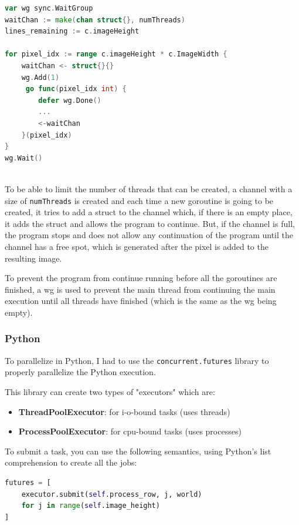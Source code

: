 \begin{lstlisting}[language=Go, caption={Goroutines.}, label={lst:go_goroutines_example}]
var wg sync.WaitGroup
waitChan := make(chan struct{}, numThreads)
lines_remaining := c.imageHeight

for pixel_idx := range c.imageHeight * c.ImageWidth {
    waitChan <- struct{}{}
    wg.Add(1)
     go func(pixel_idx int) { 
        defer wg.Done()
        ... 
        <-waitChan 
    }(pixel_idx)
}
wg.Wait()
    
\end{lstlisting}

To be able to limit the number of threads that can be created, a channel with a size of \texttt{numThreads} is created and each time a new \gls{goroutine} is going to be created, it tries to add a struct to the channel which, if there is an empty place, it adds the struct and allows the program to continue. But, if the channel is full, the program stops and does not allow any continuation of the program until the channel has a free spot, which is generated after the pixel is added to the resulting image.

To prevent the program from continue running before all the \glspl{goroutine} are finished, a \gls{wg} is used to prevent the main thread from continuing the main execution until all threads have finished (which is the same as the \gls{wg} being empty).

\subsubsection{Python}

To parallelize in Python, I had to use the \texttt{concurrent.futures} library to properly parallelize the Python execution.

This library can create two types of "executors" which are:
\begin{itemize}
    \item \textbf{ThreadPoolExecutor}: for \gls{i-o}-bound tasks (uses threads)
    \item \textbf{ProcessPoolExecutor}: for \gls{cpu}-bound tasks (uses processes)
\end{itemize}
To submit a task, you can use the following semantics, using Python's list comprehension to create all the jobs:
\begin{lstlisting}[language=Python, caption={Python submiting jobs ProcessPoolExecutor.}, label={lst:python_executor_sumbit}]
futures = [
    executor.submit(self.process_row, j, world)
    for j in range(self.image_height)
]
\end{lstlisting}

